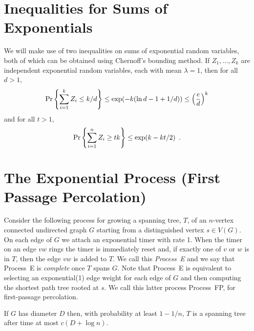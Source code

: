 \documentclass{patmorin}
\begin{document}
\section{Inequalities for Sums of Exponentials}

We will make use of two inequalities on sums of exponential random
variables, both of which can be obtained using Chernoff's bounding method.
If $Z_1,\ldots,Z_k$ are independent exponential random variables, each
with mean $\lambda=1$, then for all $d>1$,
\begin{equation}
    \Pr\left\{\sum_{i=1}^k Z_i \le k/d\right\} \le \exp(-k(\ln d -1 + 1/d)) \le \left(\frac{e}{d}\right)^k  \eqlabel{head-bound}
\end{equation}
and for all $t>1$, 
\begin{equation}
    \Pr\left\{\sum_{i=1}^n Z_i \ge tk\right\} \le \exp (k- k t/2) \enspace . \eqlabel{tail-bound}
\end{equation}


\section{The Exponential Process (First Passage Percolation)}

Consider the following process for growing a spanning tree, $T$, of an
$n$-vertex connected undirected graph $G$ starting from a distinguished
vertex $s\in V(G)$.  On each edge of $G$ we attach an exponential timer
with rate 1. When the timer on an edge $vw$ rings the timer is immediately
reset and, if exactly one of $v$ or $w$ is in $T$, then the edge $vw$
is added to $T$.  We call this \emph{Process~E} and we say that Process~E
is \emph{complete} once $T$ spans $G$.  Note that Process~E is equivalent to selecting an exponential(1) edge weight for each edge of $G$ and then computing the shortest path tree rooted at $s$.  We call this latter process Process~FP, for first-passage percolation.

\begin{lem}
  If $G$ has diameter $D$ then, with probability at least $1-1/n$, $T$
  is a spanning tree after time at most $c(D+\log n)$.
\end{lem}
\end{document}

